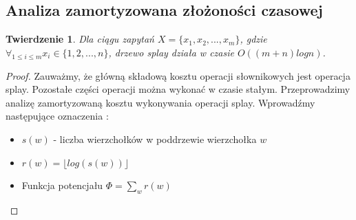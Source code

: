 \documentclass[declaration,shortabstract]{iithesis}
\theoremstyle{remark}
\theoremstyle{plain}
\newtheorem{theorem}[definition]{Twierdzenie}
\theoremstyle{plain}
\theoremstyle{plain}
\begin{document}
\subsection{Analiza zamortyzowana złożoności czasowej}
\begin{theorem}
Dla ciągu zapytań $X = \{ x_1, x_2, ..., x_m\}$, gdzie \( \forall_{1\leq i \leq m} x_i \in \{1, 2,...,n\}\), drzewo splay działa w czasie \( O((m+n)logn)\).
\end{theorem}
\begin{proof}
Zauważmy, że główną składową kosztu operacji słownikowych jest operacja splay. Pozostałe części operacji można wykonać w czasie stałym. Przeprowadzimy analizę zamortyzowaną kosztu wykonywania operacji splay. Wprowadźmy następujące oznaczenia : 
\begin{itemize}
\item{\(s(w)\) - liczba wierzchołków w poddrzewie wierzchołka \(w\)}
\item{\(r(w) = \lfloor log(s(w)) \rfloor\)}
\item{Funkcja potencjału \(\Phi = \sum_w r(w)\)}
\end{itemize}


\end{proof}
\end{document}
